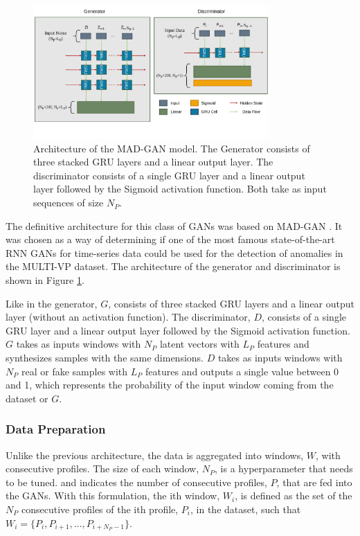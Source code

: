 \begin{figure}
    \centering
    \includegraphics[width=0.8\textwidth]{figures/madgan_arch.png}
    \caption[MAD-GAN Architecture]{Architecture of the MAD-GAN model. The Generator consists of three stacked GRU layers and a linear output layer. The discriminator consists of a single GRU layer and a linear output layer followed by the Sigmoid activation function. Both take as input sequences of size $N_P$.}
    \label{fig:madgan_architecture}
\end{figure}

The definitive architecture for this class of GANs was based on MAD-GAN \cite{li.etal_MADGANMultivariateAnomaly_2019}. It was chosen as a way of determining if one of the most famous state-of-the-art RNN GANs for time-series data could be used for the detection of anomalies in the MULTI-VP dataset. The architecture of the generator and discriminator is shown in Figure \ref{fig:madgan_architecture}.

Like in \cite{li.etal_MADGANMultivariateAnomaly_2019} the generator, $G$, consists of three stacked GRU layers and a linear output layer (without an activation function). The discriminator, $D$, consists of a single GRU layer and a linear output layer followed by the Sigmoid activation function. $G$ takes as inputs windows with $N_P$ latent vectors with $L_P$ features and synthesizes samples with the same dimensions. $D$ takes as inputs windows with $N_P$ real or fake samples with $L_P$ features and outputs a single value between 0 and 1, which represents the probability of the input window coming from the dataset or $G$.

\subsubsection*{Data Preparation}
Unlike the previous architecture, the data is aggregated into windows, $W$, with consecutive profiles. The size of each window, $N_P$, is a hyperparameter that needs to be tuned. and indicates the number of consecutive profiles, $P$, that are fed into the GANs. With this formulation, the ith window, $W_i$, is defined as the set of the $N_P$ consecutive profiles of the ith profile, $P_i$, in the dataset, such that $W_i = \{P_i, P_{i+1}, ..., P_{i+N_P-1}\}$.


